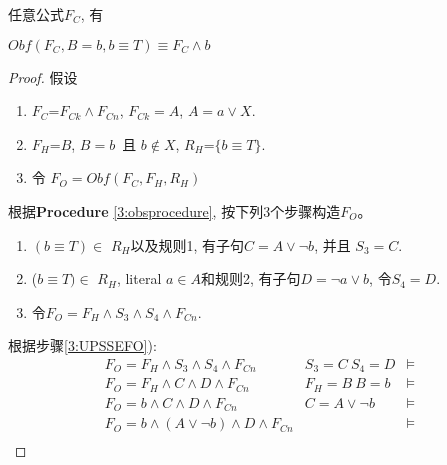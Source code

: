 \begin{lemma}\label{3:UPSSE-lemma}
任意公式$F_C$, 有

\textbf{$Obf(F_C,B=b,{b\equiv T})\equiv F_C\wedge b$}
\end{lemma}
\begin{proof}
假设
\begin{enumerate}
 \item[] $F_C$=$F_{Ck} \wedge F_{Cn}$, $F_{Ck}=A$, $A=a\vee X$.
 \item[] $F_H$=$B$, $B=b$~且 $b\notin X$, $R_H$=$\{b\equiv T\}$.
 \item[] 令 $F_O=Obf(F_C,F_H,R_H)$
 \end{enumerate}
根据\textbf{Procedure} \ref{3:obsprocedure}, 按下列3个步骤构造$F_O$。
\begin{enumerate}
\item $(b\equiv T) \in $ $R_H$以及规则1,
有子句$C=A\vee \neg b$, 并且 $S_3=C$.
\item
($b\equiv T) \in $ $R_H$, literal $a\in A$和规则2,
有子句$D=\neg a\vee b$,
令$S_4=D$.
\item \label{3:UPSSEFO}
令$F_O=F_H \wedge S_3\wedge S_4 \wedge F_{Cn}$.
\end{enumerate}
根据步骤\ref{3:UPSSEFO}):
\begin{equation}
\begin{array}{ccc}
F_O  =  F_H \wedge S_3\wedge S_4\wedge F_{Cn}           &S_3=C~ S_4=D              &\models\\
F_O  =  F_H\wedge C\wedge D\wedge F_{Cn}                &F_H=B~ B=b                &\models\\
F_O  =  b\wedge C\wedge D\wedge F_{Cn}                  &C=A\vee \neg b~           &\models\\
F_O  =  b\wedge (A\vee \neg b) \wedge D\wedge F_{Cn}    &                          &\models\\

\end{array}
\end{equation}
\end{proof}
